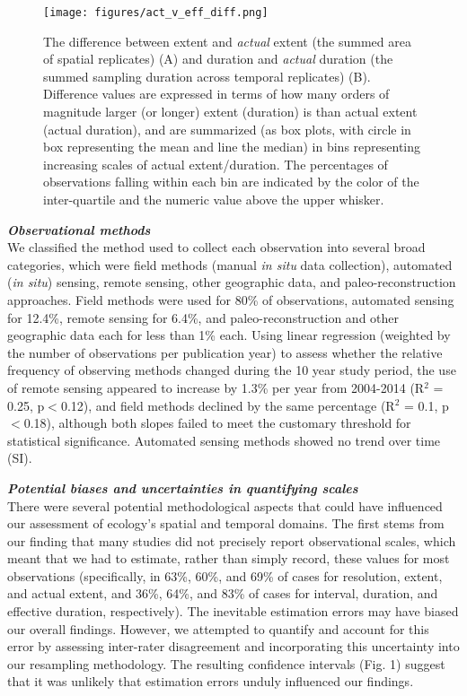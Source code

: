 \documentclass[12pt]{article}
\begin{document}
\begin{figure}[ht]
\texttt{[image: figures/act\_v\_eff\_diff.png]}
\vspace{-0.2 cm}
\caption{The difference between extent and \emph{actual} extent (the summed area of spatial replicates) (A) and duration and \emph{actual} duration (the summed sampling duration across temporal replicates) (B). Difference values are expressed in terms of how many orders of magnitude larger (or longer) extent (duration) is than actual extent (actual duration), and are summarized (as box plots, with circle in box representing the mean and line the median) in bins representing increasing scales of actual extent/duration.  The percentages of observations falling within each bin are indicated by the color of the inter-quartile and the numeric value above the upper whisker.}
\label{afoto1}
\end{figure}

\noindent \textbf{\emph{Observational methods}}\\
We classified the method used to collect each observation into several broad categories, which were field methods (manual \emph{in situ} data collection), automated (\emph{in situ}) sensing, remote sensing, other geographic data, and paleo-reconstruction approaches. Field methods were used for 80\% of observations, automated sensing for 12.4\%, remote sensing for 6.4\%, and paleo-reconstruction and other geographic data each for less than 1\% each. Using linear regression (weighted by the number of observations per publication year) to assess whether the relative frequency of observing methods changed during the 10 year study period, the use of remote sensing appeared to increase by 1.3\% per year from 2004-2014 (R$^2$ = 0.25, p$<$0.12), and field methods declined by the same percentage (R$^2$ = 0.1, p$<$0.18), although both slopes failed to meet the customary threshold for statistical significance. Automated sensing methods showed no trend over time (SI). 

\noindent \textbf{\emph{Potential biases and uncertainties in quantifying scales}}\\
There were several potential methodological aspects that could have influenced our assessment of ecology's spatial and temporal domains. The first stems from our finding that many studies did not precisely report observational scales, which meant that we had to estimate, rather than simply record, these values for most observations (specifically, in 63\%, 60\%, and 69\% of cases for resolution, extent, and actual extent, and 36\%, 64\%, and 83\% of cases for interval, duration, and effective duration, respectively). The inevitable estimation errors may have biased our overall findings. However, we attempted to quantify and account for this error by assessing inter-rater disagreement and incorporating this uncertainty into our resampling methodology. The resulting confidence intervals (Fig. 1) suggest that it was unlikely that estimation errors unduly influenced our findings. 
\end{document}
